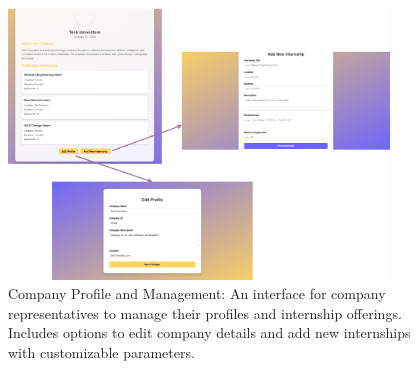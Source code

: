 \begin{figure}[!h]
\centering
\includegraphics[width=0.9\textwidth, angle=0]{Images/Main5.png}
\caption{\label{fig:metamodel}Company Profile and Management: An interface for company representatives to manage their profiles and internship offerings. Includes options to edit company details and add new internships with customizable parameters.}
\end{figure}

 